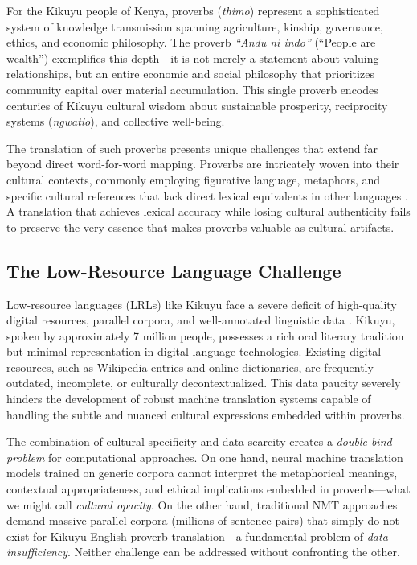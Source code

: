 For the Kikuyu people of Kenya, proverbs (\emph{thimo}) represent a sophisticated system of knowledge transmission spanning agriculture, kinship, governance, ethics, and economic philosophy. The proverb \emph{``Andu ni indo''} (``People are wealth'') exemplifies this depth—it is not merely a statement about valuing relationships, but an entire economic and social philosophy that prioritizes community capital over material accumulation. This single proverb encodes centuries of Kikuyu cultural wisdom about sustainable prosperity, reciprocity systems (\emph{ngwatio}), and collective well-being.

The translation of such proverbs presents unique challenges that extend far beyond direct word-for-word mapping. Proverbs are intricately woven into their cultural contexts, commonly employing figurative language, metaphors, and specific cultural references that lack direct lexical equivalents in other languages \cite{mieder2004proverbs}. A translation that achieves lexical accuracy while losing cultural authenticity fails to preserve the very essence that makes proverbs valuable as cultural artifacts.

\subsection{The Low-Resource Language Challenge}
\label{subsec:lrl_challenge}

Low-resource languages (LRLs) like Kikuyu face a severe deficit of high-quality digital resources, parallel corpora, and well-annotated linguistic data \cite{joshi2020state}. Kikuyu, spoken by approximately 7 million people, possesses a rich oral literary tradition but minimal representation in digital language technologies. Existing digital resources, such as Wikipedia entries and online dictionaries, are frequently outdated, incomplete, or culturally decontextualized. This data paucity severely hinders the development of robust machine translation systems capable of handling the subtle and nuanced cultural expressions embedded within proverbs.

The combination of cultural specificity and data scarcity creates a \emph{double-bind problem} for computational approaches. On one hand, neural machine translation models trained on generic corpora cannot interpret the metaphorical meanings, contextual appropriateness, and ethical implications embedded in proverbs—what we might call \emph{cultural opacity}. On the other hand, traditional NMT approaches demand massive parallel corpora (millions of sentence pairs) that simply do not exist for Kikuyu-English proverb translation—a fundamental problem of \emph{data insufficiency}. Neither challenge can be addressed without confronting the other.

